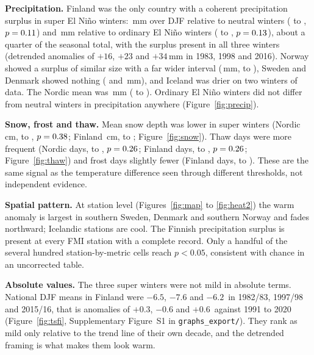 \textbf{Precipitation.} Finland was the only country with a coherent precipitation surplus in super El Niño winters: \fiPSvNdiff\,mm over DJF relative to neutral winters (\fiPSvNlo{} to \fiPSvNhi, $p = 0.11$) and \fiPSvEdiff\,mm relative to ordinary El Niño winters (\fiPSvElo{} to \fiPSvEhi, $p = 0.13$), about a quarter of the seasonal total, with the surplus present in all three winters (detrended anomalies of $+16$, $+23$ and $+34$\,mm in 1983, 1998 and 2016). Norway showed a surplus of similar size with a far wider interval (\noPSvNdiff\,mm, \noPSvNlo{} to \noPSvNhi), Sweden and Denmark showed nothing (\sePSvNdiff{} and \dkPSvNdiff\,mm), and Iceland was drier on two winters of data. The Nordic mean was \nordicPSvNdiff\,mm (\nordicPSvNlo{} to \nordicPSvNhi). Ordinary El Niño winters did not differ from neutral winters in precipitation anywhere (Figure~\ref{fig:precip}).

\textbf{Snow, frost and thaw.} Mean snow depth was lower in super winters (Nordic \nordicSSvNdiff\,cm, \nordicSSvNlo{} to \nordicSSvNhi, $p = 0.38$; Finland \fiSSvNdiff\,cm, \fiSSvNlo{} to \fiSSvNhi; Figure~\ref{fig:snow}). Thaw days were more frequent (Nordic \nordicThawSvNdiff{} days, \nordicThawSvNlo{} to \nordicThawSvNhi, $p = 0.26$; Finland \fiThawSvNdiff{} days, \fiThawSvNlo{} to \fiThawSvNhi, $p = 0.26$; Figure~\ref{fig:thaw}) and frost days slightly fewer (Finland \fiFrostSvNdiff{} days, \fiFrostSvNlo{} to \fiFrostSvNhi). These are the same signal as the temperature difference seen through different thresholds, not independent evidence.

\textbf{Spatial pattern.} At station level (Figures~\ref{fig:map} to \ref{fig:heat2}) the warm anomaly is largest in southern Sweden, Denmark and southern Norway and fades northward; Icelandic stations are cool. The Finnish precipitation surplus is present at every FMI station with a complete record. Only a handful of the several hundred station-by-metric cells reach $p < 0.05$, consistent with chance in an uncorrected table.

\textbf{Absolute values.} The three super winters were not mild in absolute terms. National DJF means in Finland were $-6.5$, $-7.6$ and $-6.2$\,\degC{} in 1982/83, 1997/98 and 2015/16, that is anomalies of $+0.3$, $-0.6$ and $+0.6$\,\degC{} against 1991 to 2020 (Figure~\ref{fig:tsfi}, Supplementary Figure~S1 in \texttt{graphs\_export/}). They rank as mild only relative to the trend line of their own decade, and the detrended framing is what makes them look warm.


